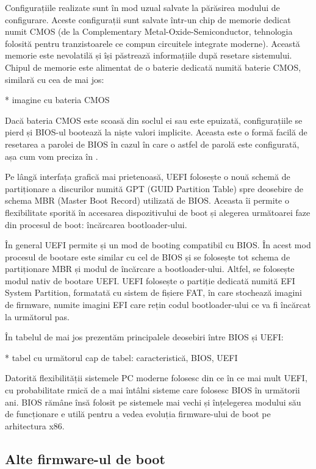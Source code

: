 Configurațiile realizate sunt în mod uzual salvate la părăsirea modului de
configurare. Aceste configurații sunt salvate într-un chip de memorie dedicat
numit CMOS (de la Complementary Metal-Oxide-Semiconductor, tehnologia folosită
pentru tranzistoarele ce compun circuitele integrate moderne). Această memorie
este nevolatilă și își păstrează informațiile după resetare sistemului. Chipul
de memorie este alimentat de o baterie dedicată numită baterie CMOS, similară cu
cea de mai jos:

* imagine cu bateria CMOS

Dacă bateria CMOS este scoasă din soclul ei sau este epuizată, configurațiile se
pierd și BIOS-ul bootează la niște valori implicite. Aceasta este o formă facilă
de resetarea a parolei de BIOS în cazul în care o astfel de parolă este
configurată, așa cum vom preciza în .

Pe lângă interfața grafică mai prietenoasă, UEFI folosește o nouă schemă de
partiționare a discurilor numită GPT (GUID Partition Table) spre deosebire de
schema MBR (Master Boot Record) utilizată de BIOS. Aceasta îi permite o
flexibilitate sporită în accesarea dispozitivului de boot și alegerea următoarei
faze din procesul de boot: încărcarea bootloader-ului.

În general UEFI permite și un mod de booting compatibil cu BIOS. În acest mod
procesul de bootare este similar cu cel de BIOS și se folosește tot schema de
partiționare MBR și modul de încărcare a bootloader-ului. Altfel, se folosește
modul nativ de bootare UEFI. UEFI folosește o partiție dedicată numită EFI
System Partition, formatată cu sistem de fișiere FAT, în care stochează imagini
de firmware, numite imagini EFI care rețin codul bootloader-ului ce va fi
încărcat la următorul pas.

În tabelul de mai jos prezentăm principalele deosebiri între BIOS și UEFI:

* tabel cu următorul cap de tabel: caracteristică, BIOS, UEFI

Datorită flexibilității sistemele PC moderne folosesc din ce în ce mai mult
UEFI, cu probabilitate rmică de a mai întâlni sisteme care folosesc BIOS în
următorii ani. BIOS rămâne însă folosit pe sistemele mai vechi și înțelegerea
modului său de funcționare e utilă pentru a vedea evoluția firmware-ului de boot
pe arhitectura x86.

\subsection{Alte firmware-ul de boot}
\label{sec:boot-firmware-uefi}

